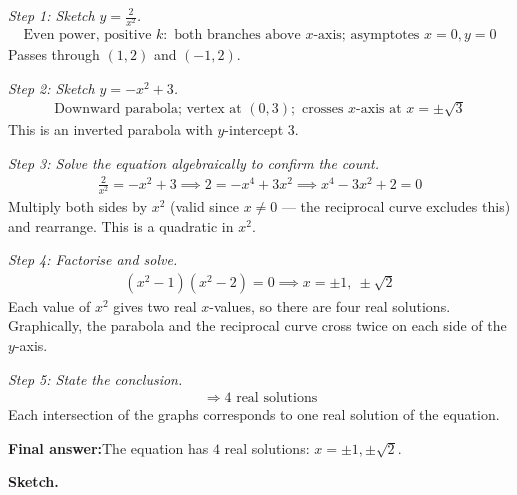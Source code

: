 \documentclass[11pt]{article}
\begin{document}
\textit{Step 1: Sketch \( y = \frac{2}{x^2} \).}
\[\begin{gathered}
\text{Even power, positive }k: \text{ both branches above }x\text{-axis; asymptotes } x=0, y=0
\end{gathered}\]
Passes through \( (1, 2) \) and \( (-1, 2) \).

\textit{Step 2: Sketch \( y = -x^2 + 3 \).}
\[\begin{gathered}
\text{Downward parabola; vertex at } (0, 3); \text{ crosses }x\text{-axis at } x = \pm\sqrt{3}
\end{gathered}\]
This is an inverted parabola with \( y \)-intercept 3.

\textit{Step 3: Solve the equation algebraically to confirm the count.}
\[\begin{gathered}
\tfrac{2}{x^2} = -x^2 + 3 \implies 2 = -x^4 + 3x^2 \implies x^4 - 3x^2 + 2 = 0
\end{gathered}\]
Multiply both sides by \( x^2 \) (valid since \( x \neq 0 \) --- the reciprocal curve excludes this) and rearrange. This is a quadratic in \( x^2 \).

\textit{Step 4: Factorise and solve.}
\[\begin{gathered}
(x^2 - 1)(x^2 - 2) = 0 \implies x = \pm 1,\ \pm\sqrt{2}
\end{gathered}\]
Each value of \( x^2 \) gives two real \( x \)-values, so there are four real solutions. Graphically, the parabola and the reciprocal curve cross twice on each side of the \( y \)-axis.

\textit{Step 5: State the conclusion.}
\[\begin{gathered}
\Rightarrow 4 \text{ real solutions}
\end{gathered}\]
Each intersection of the graphs corresponds to one real solution of the equation.

\begin{answerbox}
\textbf{Final answer:}\quad The equation has \(\displaystyle 4\) real solutions: \(\displaystyle x = \pm 1, \pm\sqrt{2}\).
\end{answerbox}
\textbf{Sketch.}
\end{document}
